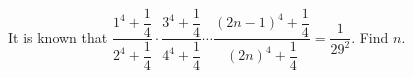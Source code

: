 It is known that $\dfrac{1^{4}+\dfrac{1}{4}}{2^{4}+\dfrac{1}{4}}\cdot\dfrac{3^{4}+\dfrac{1}{4}}{4^{4}+\dfrac{1}{4}}\cdots\dfrac{(2n-1)^{4}+\dfrac{1}{4}}{(2n)^{4}+\dfrac{1}{4}}= \dfrac{1}{29^{2}}$. Find $n$.
